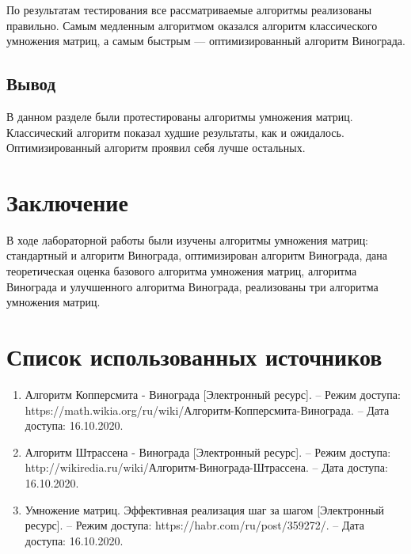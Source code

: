 \documentclass[12pt]{report}
\begin{document}
\par
По результатам тестирования все рассматриваемые алгоритмы реализованы правильно. Самым медленным алгоритмом оказался алгоритм классического умножения матриц, а самым быстрым — оптимизированный алгоритм Винограда.


\section{Вывод}
В данном разделе были протестированы алгоритмы умножения матриц. Классический алгоритм 
показал худшие результаты, как и ожидалось. Оптимизированный алгоритм проявил себя лучше остальных.

\chapter*{Заключение}
В ходе лабораторной работы были изучены алгоритмы умножения матриц: стандартный и алгоритм Винограда, оптимизирован алгоритм Винограда, дана теоретическая оценка базового алгоритма умножения матриц, алгоритма Винограда и улучшенного алгоритма Винограда, реализованы три алгоритма умножения матриц.



\chapter*{Список использованных источников}
\begin{enumerate}
	\item Алгоритм Копперсмита - Винограда [Электронный ресурс]. – Режим доступа: https://math.wikia.org/ru/wiki/Алгоритм-Копперсмита-Винограда. – Дата доступа: 16.10.2020.
	\item Алгоритм Штрассена - Винограда [Электронный ресурс]. – Режим доступа: http://wikiredia.ru/wiki/Алгоритм-Винограда-Штрассена. – Дата доступа: 16.10.2020.
	\item Умножение матриц. Эффективная реализация шаг за шагом [Электронный ресурс]. – Режим доступа: https://habr.com/ru/post/359272/. – Дата доступа: 16.10.2020.
\end{enumerate}
\end{document}
